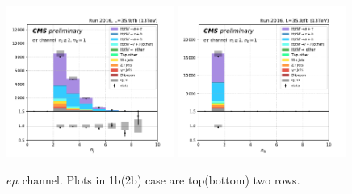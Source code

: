 \begin{figure}[ht]
    \includegraphics[width=0.49\textwidth]{chapters/Appendix/sectionPlots/figures/kinematics_pickles/etau/1b/etau_1b_nJets.pdf}
    \includegraphics[width=0.49\textwidth]{chapters/Appendix/sectionPlots/figures/kinematics_pickles/etau/1b/etau_1b_nBJets.pdf}
    
    \caption{$e\mu$ channel. Plots in 1b(2b) case are top(bottom) two rows.}
\end{figure}

